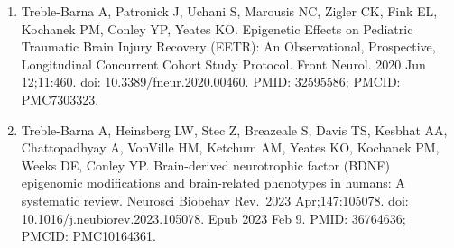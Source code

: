 \documentclass[
  letterpaper,
  DIV=11,
  numbers=noendperiod]{scrreprt}
\begin{document}

\begin{enumerate}
\def\labelenumi{\arabic{enumi}.}
\item
  Treble-Barna A, Patronick J, Uchani S, Marousis NC, Zigler CK, Fink
  EL, Kochanek PM, Conley YP, Yeates KO. Epigenetic Effects on Pediatric
  Traumatic Brain Injury Recovery (EETR): An Observational, Prospective,
  Longitudinal Concurrent Cohort Study Protocol. Front Neurol. 2020 Jun
  12;11:460. doi: 10.3389/fneur.2020.00460. PMID: 32595586; PMCID:
  PMC7303323.
\item
  Treble-Barna A, Heinsberg LW, Stec Z, Breazeale S, Davis TS, Kesbhat
  AA, Chattopadhyay A, VonVille HM, Ketchum AM, Yeates KO, Kochanek PM,
  Weeks DE, Conley YP. Brain-derived neurotrophic factor (BDNF)
  epigenomic modifications and brain-related phenotypes in humans: A
  systematic review. Neurosci Biobehav Rev.~2023 Apr;147:105078. doi:
  10.1016/j.neubiorev.2023.105078. Epub 2023 Feb 9. PMID: 36764636;
  PMCID: PMC10164361.
\end{enumerate}
\end{document}
